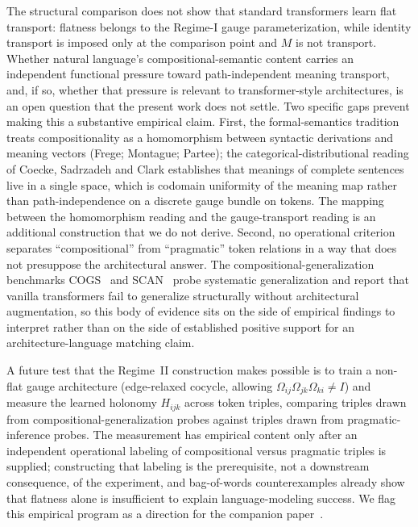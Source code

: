 \documentclass[twoside,11pt]{article}
\begin{document}
The structural comparison does not show that standard transformers learn flat transport: flatness belongs to the Regime-I gauge parameterization, while identity transport is imposed only at the comparison point and $M$ is not transport. Whether natural language's compositional-semantic content carries an independent functional pressure toward path-independent meaning transport, and, if so, whether that pressure is relevant to transformer-style architectures, is an open question that the present work does not settle. Two specific gaps prevent making this a substantive empirical claim. First, the formal-semantics tradition treats compositionality as a homomorphism between syntactic derivations and meaning vectors (Frege; Montague; Partee); the categorical-distributional reading of Coecke, Sadrzadeh and Clark establishes that meanings of complete sentences live in a single space, which is codomain uniformity of the meaning map rather than path-independence on a discrete gauge bundle on tokens. The mapping between the homomorphism reading and the gauge-transport reading is an additional construction that we do not derive. Second, no operational criterion separates ``compositional'' from ``pragmatic'' token relations in a way that does not presuppose the architectural answer. The compositional-generalization benchmarks COGS~\citep{kim2020cogs} and SCAN~\citep{lake2018generalization} probe systematic generalization and report that vanilla transformers fail to generalize structurally without architectural augmentation, so this body of evidence sits on the side of empirical findings to interpret rather than on the side of established positive support for an architecture-language matching claim.

A future test that the Regime~II construction makes possible is to train a non-flat gauge architecture (edge-relaxed cocycle, allowing $\Omega_{ij}\Omega_{jk}\Omega_{ki} \neq I$) and measure the learned holonomy $H_{ijk}$ across token triples, comparing triples drawn from compositional-generalization probes against triples drawn from pragmatic-inference probes. The measurement has empirical content only after an independent operational labeling of compositional versus pragmatic triples is supplied; constructing that labeling is the prerequisite, not a downstream consequence, of the experiment, and bag-of-words counterexamples already show that flatness alone is insufficient to explain language-modeling success. We flag this empirical program as a direction for the companion paper~\citep{Dennis2025it}.
\end{document}
